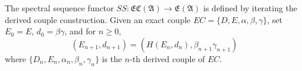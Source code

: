 The spectral sequence functor $\mathit{SS} : \mathfrak{EC}(\mathfrak{A}) \to \mathfrak{E}(\mathfrak{A})$ is defined by iterating the derived couple construction. Given an exact couple $\mathit{EC} = \{D, E, \alpha, \beta, \gamma\}$, set $E_0 = E$, $d_0 = \beta\gamma$, and for $n \geq 0$,
$$(E_{n+1}, d_{n+1}) = (H(E_n, d_n), \beta_{n+1}\gamma_{n+1})$$
where $\{D_n, E_n, \alpha_n, \beta_n, \gamma_n\}$ is the $n$-th derived couple of $\mathit{EC}$.
